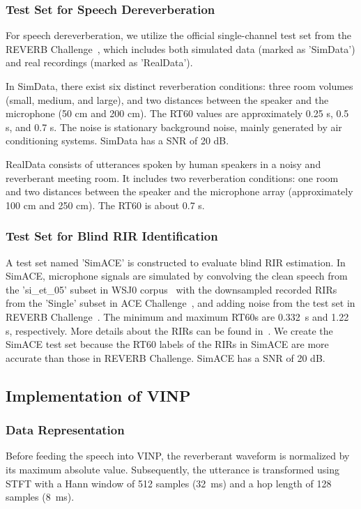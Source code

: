 \subsubsection{{Test Set for Speech Dereverberation}}
For speech dereverberation, we utilize the official single-channel test set from the REVERB Challenge~\cite{kinoshita2013reverb}, which includes both simulated data (marked as 'SimData') and real recordings (marked as 'RealData').

In SimData, there exist six distinct reverberation conditions: three room volumes (small, medium, and large), and two distances between the speaker and the microphone (50 cm and 200 cm). The RT60 values are approximately 0.25 s, 0.5 s, and 0.7 s. 
The noise is stationary background noise, mainly generated by air conditioning systems. 
SimData has a SNR of 20 dB.

RealData consists of utterances spoken by human speakers in a noisy and reverberant meeting room. It includes two reverberation conditions: one room and two distances between the speaker and the microphone array (approximately 100 cm and 250 cm). The RT60 is about 0.7 s.

\subsubsection{{Test Set for Blind RIR Identification}}
A test set named 'SimACE' is constructed to evaluate blind RIR estimation.
In SimACE, microphone signals are simulated by convolving the clean speech from the 'si\_et\_05' subset in WSJ0 corpus~\cite{paul1992design} with the downsampled recorded RIRs from the 'Single' subset in ACE Challenge~\cite{eaton2016estimation}, and adding noise from the test set in REVERB Challenge~\cite{kinoshita2013reverb}.
The minimum and maximum RT60s are 0.332~s and 1.22 s, respectively.
More details about the RIRs can be found in~\cite{eaton2016estimation}.
We create the SimACE test set because the RT60 labels of the RIRs in SimACE are more accurate than those in REVERB Challenge.
SimACE has a SNR of 20 dB.

\subsection{Implementation of VINP}
\subsubsection{Data Representation}
Before feeding the speech into VINP, the reverberant waveform is normalized by its maximum absolute value. 
Subsequently, the utterance is transformed using STFT with a Hann window of 512 samples (32~ms) and a hop length of 128 samples (8~ms). 

